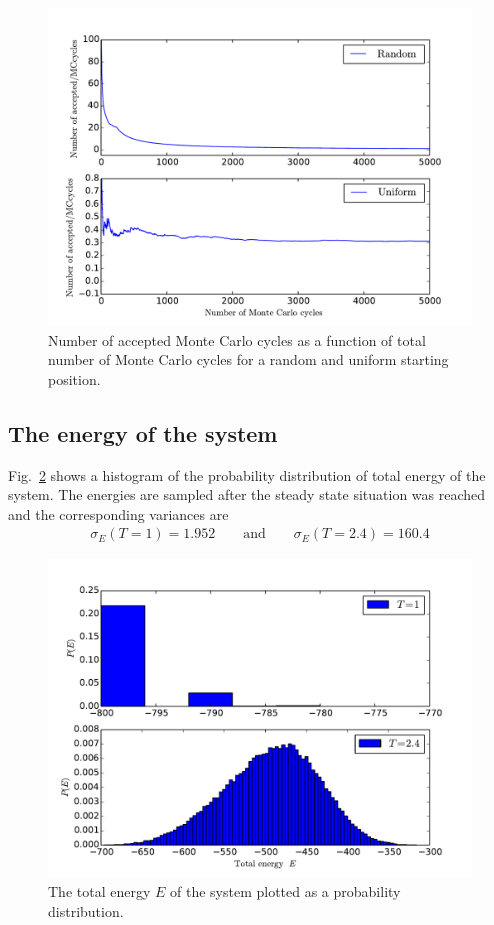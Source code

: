 \documentclass[twoside, 11pt]{article}
\begin{document}
		\begin{figure}
			\includegraphics[scale=0.7]{../Results/task_c/task_c_accepted_T1.pdf}
			\caption{Number of accepted Monte Carlo cycles as a function of total number of Monte Carlo cycles for a random and uniform starting position.}
			\label{fig: accepted as function of MCcycles}
		\end{figure}
		
		
	\subsection{The energy of the system}
		Fig.~\ref{fig: P(E) histogram} shows a histogram of the probability distribution of total energy of the system. The energies are sampled after the steady state situation was reached and the corresponding variances are
		\begin{align*}
			\sigma_E(T=1) = 1.952 \qquad \mathrm{and} \qquad \sigma_E(T=2.4) = 160.4
		\end{align*}
		
		\begin{figure}
			\includegraphics[scale=0.7]{../Results/task_d/task_d_histogram_Uniform.pdf}
			\caption{The total energy $E$ of the system plotted as a probability distribution. }
			\label{fig: P(E) histogram}
		\end{figure}
	
\end{document}
